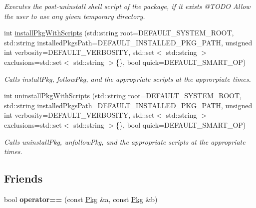 \begin{DoxyCompactItemize}
\begin{DoxyCompactList}\small\item\em Executes the post-\/uninstall shell script of the package, if it exists @\+T\+O\+DO Allow the user to use any given temporary directory. \end{DoxyCompactList}\item 
int \mbox{\hyperlink{classPkg_a2b503d8da35d9e8d1e3009fe3539e8a8}{install\+Pkg\+With\+Scripts}} (std\+::string root=D\+E\+F\+A\+U\+L\+T\+\_\+\+S\+Y\+S\+T\+E\+M\+\_\+\+R\+O\+OT, std\+::string installed\+Pkgs\+Path=D\+E\+F\+A\+U\+L\+T\+\_\+\+I\+N\+S\+T\+A\+L\+L\+E\+D\+\_\+\+P\+K\+G\+\_\+\+P\+A\+TH, unsigned int verbosity=D\+E\+F\+A\+U\+L\+T\+\_\+\+V\+E\+R\+B\+O\+S\+I\+TY, std\+::set$<$ std\+::string $>$ exclusions=std\+::set$<$ std\+::string $>$\{\}, bool quick=D\+E\+F\+A\+U\+L\+T\+\_\+\+S\+M\+A\+R\+T\+\_\+\+OP)
\begin{DoxyCompactList}\small\item\em Calls install\+Pkg, follow\+Pkg, and the appropriate scripts at the approrpiate times. \end{DoxyCompactList}\item 
int \mbox{\hyperlink{classPkg_ab12988c27c2fb0184c75262ecb8d5672}{uninstall\+Pkg\+With\+Scripts}} (std\+::string root=D\+E\+F\+A\+U\+L\+T\+\_\+\+S\+Y\+S\+T\+E\+M\+\_\+\+R\+O\+OT, std\+::string installed\+Pkgs\+Path=D\+E\+F\+A\+U\+L\+T\+\_\+\+I\+N\+S\+T\+A\+L\+L\+E\+D\+\_\+\+P\+K\+G\+\_\+\+P\+A\+TH, unsigned int verbosity=D\+E\+F\+A\+U\+L\+T\+\_\+\+V\+E\+R\+B\+O\+S\+I\+TY, std\+::set$<$ std\+::string $>$ exclusions=std\+::set$<$ std\+::string $>$\{\}, bool quick=D\+E\+F\+A\+U\+L\+T\+\_\+\+S\+M\+A\+R\+T\+\_\+\+OP)
\begin{DoxyCompactList}\small\item\em Calls uninstall\+Pkg, unfollow\+Pkg, and the appropriate scripts at the appropriate times. \end{DoxyCompactList}\end{DoxyCompactItemize}
\subsection*{Friends}
\begin{DoxyCompactItemize}
\item 
\mbox{\label{classPkg_a84c1f9f44d78c3c54f012b2ab2bb7c77}} 
bool {\bfseries operator==} (const \mbox{\hyperlink{classPkg}{Pkg}} \&a, const \mbox{\hyperlink{classPkg}{Pkg}} \&b)
\end{DoxyCompactItemize}


